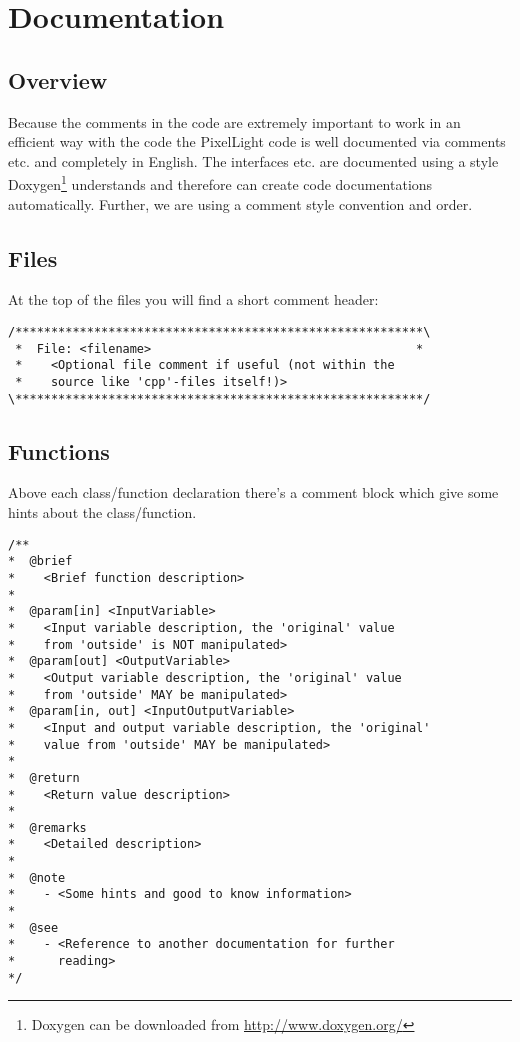 \chapter{Documentation}




\section{Overview}
Because the comments in the code are extremely important to work in an efficient way with the code the PixelLight code is well documented via comments etc. and completely in English. The interfaces etc. are documented using a style Doxygen\footnote{Doxygen can be downloaded from \url{http://www.doxygen.org/}} understands and therefore can create code documentations automatically. Further, we are using a comment style convention and order.




\section{Files}
At the top of the files you will find a short comment header:

\begin{lstlisting}[caption=Header comment]
/*********************************************************\
 *  File: <filename>                                     *
 *    <Optional file comment if useful (not within the
 *    source like 'cpp'-files itself!)>
\*********************************************************/
\end{lstlisting}




\section{Functions}
Above each class/function declaration there's a comment block which give some hints about the class/function.

\begin{lstlisting}[caption=Class/function comment block]
/**
*  @brief
*    <Brief function description>
*
*  @param[in] <InputVariable>
*    <Input variable description, the 'original' value
*    from 'outside' is NOT manipulated>
*  @param[out] <OutputVariable>
*    <Output variable description, the 'original' value
*    from 'outside' MAY be manipulated>
*  @param[in, out] <InputOutputVariable>
*    <Input and output variable description, the 'original'
*    value from 'outside' MAY be manipulated>
*
*  @return
*    <Return value description>
*
*  @remarks
*    <Detailed description>
*
*  @note
*    - <Some hints and good to know information>
*
*  @see
*    - <Reference to another documentation for further
*      reading>
*/
\end{lstlisting}

